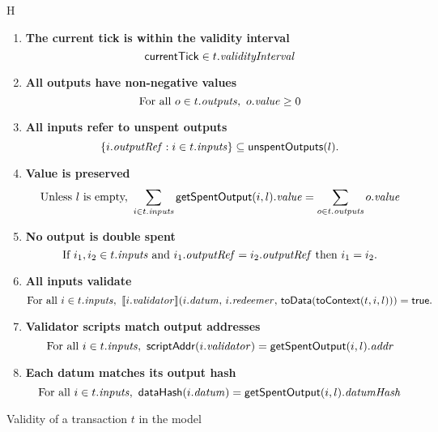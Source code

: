 \begin{ruledfigure}{H}
\begin{enumerate}

\item
  \label{rule:tick-in-range}
  \textbf{The current tick is within the validity interval}
  \begin{displaymath}
    \mathsf{currentTick} \in t.\mathit{validityInterval}
  \end{displaymath}

\item
  \label{rule:all-outputs-are-non-negative}
  \textbf{All outputs have non-negative values}
  \begin{displaymath}
    \textrm{For all } o \in t.\mathit{outputs},\ o.\mathit{value} \geq 0
  \end{displaymath}

\item
  \label{rule:all-inputs-refer-to-unspent-outputs}
  \textbf{All inputs refer to unspent outputs}
  \begin{displaymath}
    \{i.\mathit{outputRef} : i \in t.\mathit{inputs} \} \subseteq \mathsf{unspentOutputs}(l).
  \end{displaymath}

\item
  \label{rule:value-is-preserved}
  \textbf{Value is preserved}
  \begin{displaymath}
    \textrm{Unless $l$ is empty, } \sum_{i \in t.\mathit{inputs}} \mathsf{getSpentOutput}(i, l).\mathit{value} = \sum_{o \in t.\mathit{outputs}} o.\mathit{value}
  \end{displaymath}

\item
  \label{rule:no-double-spending}
  \textbf{No output is double spent}
  \begin{displaymath}
    \textrm{If } i_1, i_2 \in t.\mathit{inputs} \textrm{ and }  i_1.\mathit{outputRef} = i_2.\mathit{outputRef}
    \textrm{ then } i_1 = i_2.
  \end{displaymath}

\item
  \label{rule:all-inputs-validate}
  \textbf{All inputs validate}
  \begin{displaymath}
    \textrm{For all } i \in t.\mathit{inputs},\ \llbracket
    i.\mathit{validator}\rrbracket (i.\mathit{datum},\, i.\mathit{redeemer},\,  \mathsf{toData}(\mathsf{toContext}(t,i,l))) = \textsf{true}.
  \end{displaymath}

\item
  \label{rule:validator-scripts-hash}
  \textbf{Validator scripts match output addresses}
  \begin{displaymath}
    \textrm{For all } i \in t.\mathit{inputs},\ \mathsf{scriptAddr}(i.\mathit{validator}) = \mathsf{getSpentOutput}(i, l).\mathit{addr}
  \end{displaymath}

\item
  \label{rule:datums-hash}
  \textbf{Each datum matches its output hash}
  \begin{displaymath}
    \textrm{For all } i \in t.\inputs,\ \hashData(i.\datum) = \getSpent(i, l).\datumHsh
  \end{displaymath}

\end{enumerate}
\caption{Validity of a transaction $t$ in the \EUTXO{} model}
\label{fig:eutxo-validity}
\end{ruledfigure}
